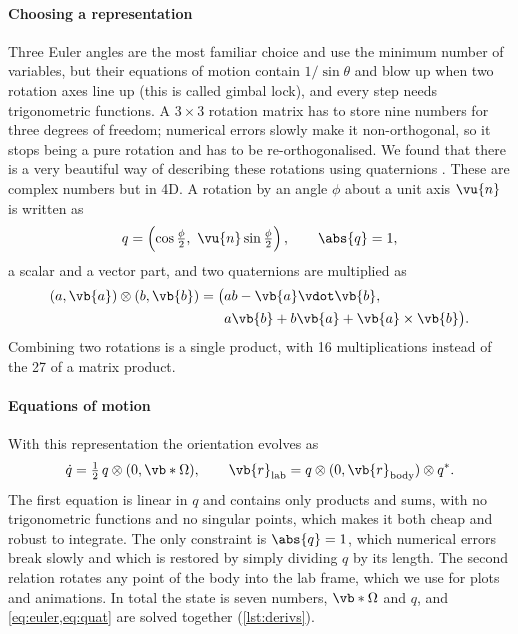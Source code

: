 \paragraph{Choosing a representation}
Three Euler angles are the most familiar choice and use the minimum number of variables, but their equations of motion contain $1/\sin\theta$ and blow up when two rotation axes line up (this is called gimbal lock), and every step needs trigonometric functions.
A $3\times3$ rotation matrix has to store nine numbers for three degrees of freedom; numerical errors slowly make it non-orthogonal, so it stops being a pure rotation and has to be re-orthogonalised.
We found that there is a very beautiful way of describing these rotations using quaternions \cite{3b1b_quat}. These are complex numbers but in 4D.
A rotation by an angle $\phi$ about a unit axis $\vu{n}$ is written as
\begin{equation}
    q = \left(\cos\tfrac{\phi}{2},\ \vu{n}\sin\tfrac{\phi}{2}\right), \qquad \abs{q}=1,
    \label{eq:quat-def}
\end{equation}
a scalar and a vector part, and two quaternions are multiplied as
\begin{equation}
\begin{aligned}
    (a,\vb{a})\otimes(b,\vb{b}) = \big(&ab-\vb{a}\vdot\vb{b},\\
                                       &a\vb{b}+b\vb{a}+\vb{a}\times\vb{b}\big).
\end{aligned}
    \label{eq:quat-mult}
\end{equation}
Combining two rotations is a single product, with 16 multiplications instead of the 27 of a matrix product.

\paragraph{Equations of motion}
With this representation the orientation evolves as
\begin{equation}
    \dot q = \tfrac12\, q\otimes(0,\vb*{\Omega}),\qquad
    \vb{r}_{\text{lab}} = q\otimes(0,\vb{r}_{\text{body}})\otimes q^{*}.
    \label{eq:quat}
\end{equation}
The first equation is linear in $q$ and contains only products and sums, with no trigonometric functions and no singular points, which makes it both cheap and robust to integrate.
The only constraint is $\abs{q}=1$, which numerical errors break slowly and which is restored by simply dividing $q$ by its length.
The second relation rotates any point of the body into the lab frame, which we use for plots and animations.
In total the state is seven numbers, $\vb*{\Omega}$ and $q$, and \cref{eq:euler,eq:quat} are solved together (\cref{lst:derivs}).

